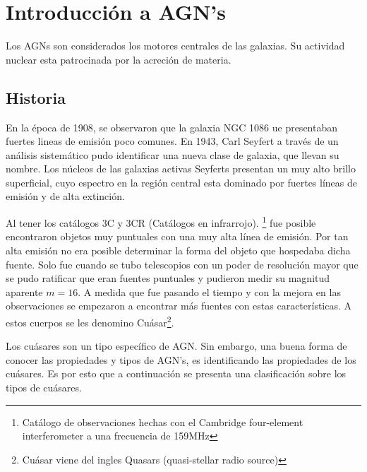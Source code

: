 \section{Introducción a AGN's}
\label{sec:Introduction_AGN's}

Los AGNs son considerados los motores centrales de las galaxias. Su  actividad nuclear esta patrocinada por la acreción de materia. 

	\subsection{Historia}
	\label{subsec:History}
	
En la época de 1908, se observaron que la galaxia NGC 1086 ue presentaban fuertes lineas de emisión poco comunes. En 1943, Carl Seyfert a través de un análisis sistemático pudo identificar una nueva clase de galaxia, que llevan su nombre. Los núcleos de  las galaxias activas Seyferts presentan un muy alto brillo superficial, cuyo espectro en la región central esta dominado por fuertes líneas de emisión y de alta extinción.  

Al tener los catálogos 3C y 3CR (Catálogos en infrarrojo). \footnote{Catálogo de observaciones hechas con el Cambridge four-element interferometer a una frecuencia de 159MHz} fue posible encontraron objetos muy puntuales con una muy alta línea de emisión. Por tan alta emisión no era posible determinar la forma del objeto que hospedaba dicha fuente. Solo fue cuando se tubo telescopios con un poder de resolución mayor que se pudo ratificar que eran fuentes puntuales y pudieron medir su magnitud aparente $m=16$. A medida que fue pasando el tiempo y con la mejora en las observaciones se empezaron a encontrar más fuentes con estas características. A estos cuerpos se les denomino  Cuásar\footnote{Cuásar viene del ingles Quasars (quasi-stellar radio source)}.

Los cuásares son un tipo específico de AGN. Sin embargo, una buena forma de conocer las propiedades y tipos de  AGN's, es identificando las propiedades de los cuásares. Es por esto que a continuación se presenta una clasificación sobre los tipos de cuásares.  


